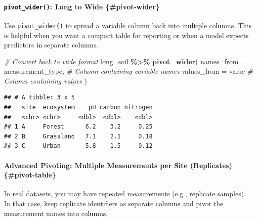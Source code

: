 \documentclass[
  10pt,
  b5paper,
  oneside]{book}
\newenvironment{Shaded}{\begin{snugshade}}{\end{snugshade}}
\newcommand{\AttributeTok}[1]{\textcolor[rgb]{0.13,0.29,0.53}{#1}}
\newcommand{\CommentTok}[1]{\textcolor[rgb]{0.56,0.35,0.01}{\textit{#1}}}
\newcommand{\FunctionTok}[1]{\textcolor[rgb]{0.13,0.29,0.53}{\textbf{#1}}}
\newcommand{\NormalTok}[1]{#1}
\newcommand{\SpecialCharTok}[1]{\textcolor[rgb]{0.81,0.36,0.00}{\textbf{#1}}}
\begin{document}
\paragraph*{\texorpdfstring{\texttt{pivot\_wider()}: Long to Wide \{\#pivot-wider\}}{pivot\_wider(): Long to Wide \{\#pivot-wider\}}}\label{pivot_wider-long-to-wide-pivot-wider}

Use \texttt{pivot\_wider()} to spread a variable column back into multiple columns. This is helpful when you want a compact table for reporting or when a model expects predictors in separate columns.

\begin{Shaded}
\begin{Highlighting}[]
\CommentTok{\# Convert back to wide format}
\NormalTok{long\_soil }\SpecialCharTok{\%\textgreater{}\%}
 \FunctionTok{pivot\_wider}\NormalTok{(}
  \AttributeTok{names\_from =}\NormalTok{ measurement\_type, }\CommentTok{\# Column containing variable names}
  \AttributeTok{values\_from =}\NormalTok{ value            }\CommentTok{\# Column containing values}
\NormalTok{ )}
\end{Highlighting}
\end{Shaded}

\begin{verbatim}
## # A tibble: 3 x 5
##   site  ecosystem    pH carbon nitrogen
##   <chr> <chr>     <dbl>  <dbl>    <dbl>
## 1 A     Forest      6.2    3.2     0.25
## 2 B     Grassland   7.1    2.1     0.18
## 3 C     Urban       5.8    1.5     0.12
\end{verbatim}

\paragraph*{Advanced Pivoting: Multiple Measurements per Site (Replicates) \{\#pivot-table\}}\label{advanced-pivoting-multiple-measurements-per-site-replicates-pivot-table}

In real datasets, you may have repeated measurements (e.g., replicate samples). In that case, keep replicate identifiers as separate columns and pivot the measurement names into columns.
\end{document}
